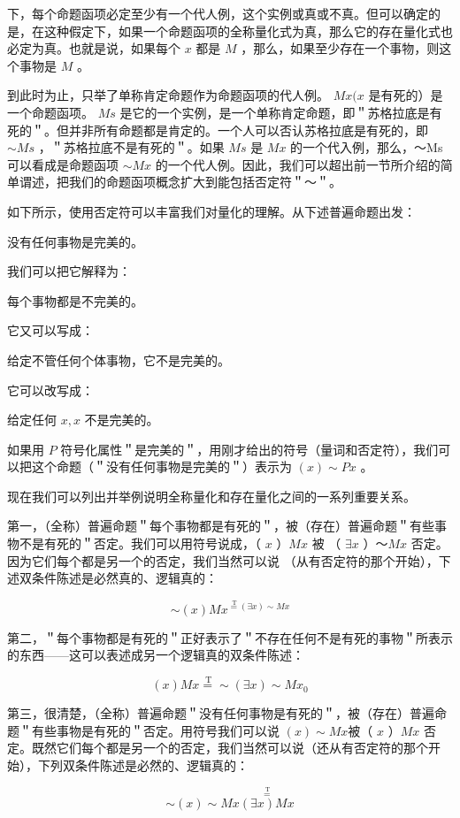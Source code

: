 下，每个命题函项必定至少有一个代人例，这个实例或真或不真。但可以确定的是，在这种假定下，如果一个命题函项的全称量化式为真，那么它的存在量化式也必定为真。也就是说，如果每个 $x$ 都是 $M$ ，那么，如果至少存在一个事物，则这个事物是 $M$ 。

到此时为止，只举了单称肯定命题作为命题函项的代人例。 $M x(x$ 是有死的）是一个命题函项。 $M s$ 是它的一个实例，是一个单称肯定命题，即＂苏格拉底是有死的＂。但并非所有命题都是肯定的。一个人可以否认苏格拉底是有死的，即 $\sim M s$ ，＂苏格拉底不是有死的＂。如果 $M s$ 是 $M x$ 的一个代入例，那么，～Ms可以看成是命题函项 $\sim M x$ 的一个代人例。因此，我们可以超出前一节所介绍的简单谓述，把我们的命题函项概念扩大到能包括否定符＂～＂。

如下所示，使用否定符可以丰富我们对量化的理解。从下述普遍命题出发：

没有任何事物是完美的。

我们可以把它解释为：

每个事物都是不完美的。

它又可以写成：

给定不管任何个体事物，它不是完美的。

它可以改写成：

给定任何 $x, x$ 不是完美的。

如果用 $P$ 符号化属性＂是完美的＂，用刚才给出的符号（量词和否定符），我们可以把这个命题（＂没有任何事物是完美的＂）表示为 $(x) \sim P x$ 。

现在我们可以列出并举例说明全称量化和存在量化之间的一系列重要关系。

第一，（全称）普遍命题＂每个事物都是有死的＂，被（存在）普遍命题＂有些事物不是有死的＂否定。我们可以用符号说成，（ $x$ ）$M x$ 被 （ $\exists x$ ）～$M x$ 否定。因为它们每个都是另一个的否定，我们当然可以说 （从有否定符的那个开始），下述双条件陈述是必然真的、逻辑真的：

$$
\sim(x) M x \stackrel{\stackrel{\mathrm{~T}}{=}(\exists x) \sim M x}{ }
$$

第二，＂每个事物都是有死的＂正好表示了＂不存在任何不是有死的事物＂所表示的东西——这可以表述成另一个逻辑真的双条件陈述：

$$
(x) M x \stackrel{\mathrm{~T}}{=} \sim(\exists x) \sim M x_{0}
$$

第三，很清楚，（全称）普遍命题＂没有任何事物是有死的＂，被（存在）普遍命题＂有些事物是有死的＂否定。用符号我们可以说 $(x) \sim M x$被（ $x$ ）$M x$ 否定。既然它们每个都是另一个的否定，我们当然可以说（还从有否定符的那个开始），下列双条件陈述是必然的、逻辑真的：

$$
\sim(x) \sim M x \stackrel{\stackrel{\mathrm{~T}}{=}}{(\exists x) M x}
$$

